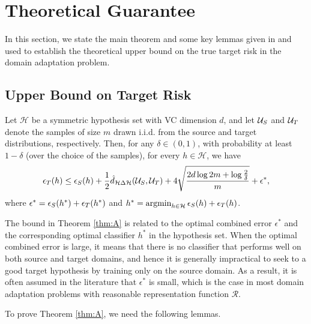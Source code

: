 \section{Theoretical Guarantee}\label{sect:bound}
In this section, we state the main theorem and some key lemmas given in \cite{BenDavid2006} and \cite{BenDavid2010} used to establish the theoretical upper bound on the true target risk in the domain adaptation problem.

\subsection{Upper Bound on Target Risk}
\begin{theorem}\label{thm:A}
  Let $\mathcal{H}$ be a symmetric hypothesis set with VC dimension $d$, and let $\mathcal{U}_S$ and $\mathcal{U}_T$ denote the samples of size $m$ drawn i.i.d. from the source and target distributions, respectively. Then, for any $\delta \in (0,1)$, with probability at least $1-\delta$ (over the choice of the samples), for every $h \in \mathcal{H}$, we have
  \begin{equation}\label{eq:A}
    \epsilon_{T}(h) \leq \epsilon_{S}(h) + \frac{1}{2} \hat{d}_{\mathcal{H} \Delta \mathcal{H}}(\mathcal{U}_S, \mathcal{U}_T) + 4 \sqrt{\frac{2d \log{2m} + \log{\frac{2}{\delta}}}{m}} + \epsilon^{*},
  \end{equation}
  where $\epsilon^{*} = \epsilon_{S}(h^*) + \epsilon_{T}(h^*)$ and $h^* = \mathop{\mathrm{argmin}}_{h \in \mathcal{H}} \epsilon_{S}(h) + \epsilon_{T}(h)$.
\end{theorem}

The bound in Theorem \ref{thm:A} is related to the optimal combined error $\epsilon^{*}$ and the corresponding optimal classifier $h^*$ in the hypothesis set. When the optimal combined error is large, it means that there is no classifier that performs well on both source and target domains, and hence it is generally impractical to seek to a good target hypothesis by training only on the source domain. As a result, it is often assumed in the literature that $\epsilon^{*}$ is small, which is the case in most domain adaptation problems with reasonable representation function $\mathcal{R}$.

To prove Theorem \ref{thm:A}, we need the following lemmas.

